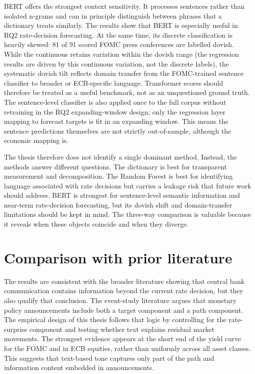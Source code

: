 BERT offers the strongest context sensitivity. It processes sentences
rather than isolated n-grams and can in principle distinguish between phrases
that a dictionary treats similarly. The results show that BERT is
especially useful in RQ2 rate-decision forecasting. At the same time, its
discrete classification is heavily skewed: 81 of 91 scored FOMC press
conferences are labelled dovish. While the continuous \bertscore{} retains
variation within the dovish range (the regression results are driven by this
continuous variation, not the discrete labels), the systematic dovish tilt
reflects domain transfer from the FOMC-trained sentence classifier to broader
or ECB-specific language. Transformer scores should therefore be treated as a
useful benchmark, not as an unquestioned ground truth. The sentence-level
classifier is also applied once to the full corpus without retraining in the
RQ2 expanding-window design; only the regression layer mapping \bertscore{} to
forecast targets is fit in an expanding window. This means the sentence
predictions themselves are not strictly out-of-sample, although the economic
mapping is.

The thesis therefore does not identify a single dominant method. Instead, the
methods answer different questions. The dictionary is best for transparent
measurement and decomposition. The Random Forest is best for identifying
language associated with rate decisions but carries a leakage risk that future
work should address. BERT is strongest for sentence-level semantic
information and near-term rate-decision forecasting, but its dovish shift and
domain-transfer limitations should be kept in mind. The three-way comparison is
valuable because it reveals when these objects coincide and when they diverge.

\section{Comparison with prior literature}
\label{sec:disc_literature}

The results are consistent with the broader literature showing that central bank
communication contains information beyond the current rate decision, but they
also qualify that conclusion. The event-study literature argues that monetary
policy announcements include both a target component and a path component. The
empirical design of this thesis follows that logic by controlling for the
rate-surprise component and testing whether text explains residual market
movements. The strongest evidence appears at the short end of the yield curve
for the FOMC and in ECB equities, rather than uniformly across all asset classes.
This suggests that text-based tone captures only part of the path and
information content embedded in announcements.

